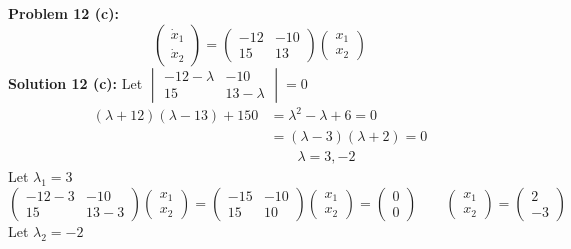 \documentclass[12pt]{article}
\begin{document}
\noindent \textbf{Problem 12 (c): } 
$$
\begin{pmatrix}
\dot{x}_1 \\
\dot{x}_2
\end{pmatrix} = 
\begin{pmatrix}
-12 & -10 \\
15 & 13
\end{pmatrix}
\begin{pmatrix}
x_1 \\
x_2
\end{pmatrix}
$$
\noindent \textbf{Solution 12 (c): } Let 
$
\begin{vmatrix}
-12 - \lambda & -10 \\
15 & 13 - \lambda
\end{vmatrix} = 0
$
\begin{align*}
(\lambda + 12)(\lambda - 13) + 150 &=  \lambda^2 - \lambda + 6 = 0 \\
&= (\lambda - 3)(\lambda + 2) = 0 \\
& \qquad \lambda = 3, -2
\end{align*}
Let $\lambda_1 = 3$
$$\begin{pmatrix}
-12 - 3  & -10 \\
15 & 13 - 3
\end{pmatrix}
\begin{pmatrix}
x_1 \\
x_2
\end{pmatrix} = 
\begin{pmatrix}
-15 & -10 \\
15 & 10
\end{pmatrix}
\begin{pmatrix}
x_1 \\
x_2
\end{pmatrix} = 
\begin{pmatrix}
0 \\
0
\end{pmatrix} \qquad 
\begin{pmatrix}
x_1 \\
x_2
\end{pmatrix} = 
\begin{pmatrix}
2 \\
-3
\end{pmatrix}$$
Let $\lambda_2 = -2$
\end{document}
